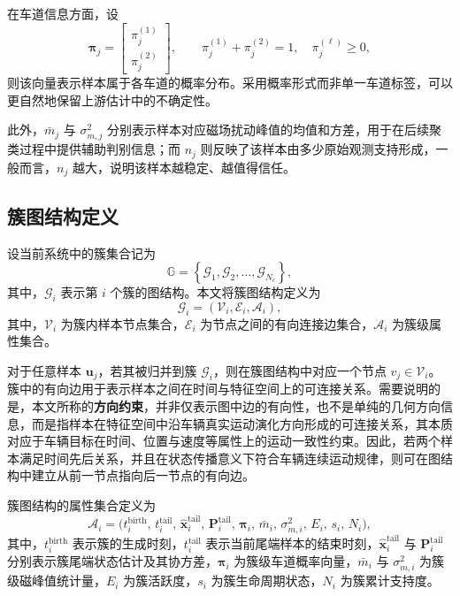 \documentclass{xdupgthesis}
\begin{document}
在车道信息方面，设
\begin{equation}
	\boldsymbol{\pi}_j=
	\begin{bmatrix}
		\pi_j^{(1)}\\[2pt]
		\pi_j^{(2)}
	\end{bmatrix},
	\qquad
	\pi_j^{(1)}+\pi_j^{(2)}=1,\quad
	\pi_j^{(\ell)}\ge 0,
\end{equation}
则该向量表示样本属于各车道的概率分布。采用概率形式而非单一车道标签，可以更自然地保留上游估计中的不确定性。

此外，$\bar m_j$ 与 $\sigma_{m,j}^{2}$ 分别表示样本对应磁场扰动峰值的均值和方差，用于在后续聚类过程中提供辅助判别信息；而 $n_j$ 则反映了该样本由多少原始观测支持形成，一般而言，$n_j$ 越大，说明该样本越稳定、越值得信任。

\subsection{簇图结构定义}

设当前系统中的簇集合记为
\begin{equation}
	\mathbb{G}=\left\{\mathcal{G}_1,\mathcal{G}_2,\ldots,\mathcal{G}_{N_c}\right\},
\end{equation}
其中，$\mathcal{G}_i$ 表示第 $i$ 个簇的图结构。本文将簇图结构定义为
\begin{equation}
	\mathcal{G}_i = \left(\mathcal{V}_i,\mathcal{E}_i,\mathcal{A}_i\right),
\end{equation}
其中，$\mathcal{V}_i$ 为簇内样本节点集合，$\mathcal{E}_i$ 为节点之间的有向连接边集合，$\mathcal{A}_i$ 为簇级属性集合。

对于任意样本 $\mathbf{u}_j$，若其被归并到簇 $\mathcal{G}_i$，则在簇图结构中对应一个节点 $v_j\in\mathcal{V}_i$。簇中的有向边用于表示样本之间在时间与特征空间上的可连接关系。需要说明的是，本文所称的\textbf{方向约束}，并非仅表示图中边的有向性，也不是单纯的几何方向信息，而是指样本在特征空间中沿车辆真实运动演化方向形成的可连接关系，其本质对应于车辆目标在时间、位置与速度等属性上的运动一致性约束。因此，若两个样本满足时间先后关系，并且在状态传播意义下符合车辆连续运动规律，则可在图结构中建立从前一节点指向后一节点的有向边。

簇图结构的属性集合定义为
\begin{equation}
	\mathcal{A}_i=
	\Big(
	t_i^{\mathrm{birth}},\,
	t_i^{\mathrm{tail}},\,
	\hat{\mathbf{x}}_i^{\mathrm{tail}},\,
	\mathbf{P}_i^{\mathrm{tail}},\,
	\boldsymbol{\pi}_i,\,
	\bar m_i,\,
	\sigma_{m,i}^{2},\,
	E_i,\,
	s_i,\,
	N_i
	\Big),
\end{equation}
其中，$t_i^{\mathrm{birth}}$ 表示簇的生成时刻，$t_i^{\mathrm{tail}}$ 表示当前尾端样本的结束时刻，$\hat{\mathbf{x}}_i^{\mathrm{tail}}$ 与 $\mathbf{P}_i^{\mathrm{tail}}$ 分别表示簇尾端状态估计及其协方差，$\boldsymbol{\pi}_i$ 为簇级车道概率向量，$\bar m_i$ 与 $\sigma_{m,i}^{2}$ 为簇级磁峰值统计量，$E_i$ 为簇活跃度，$s_i$ 为簇生命周期状态，$N_i$ 为簇累计支持度。
\end{document}
